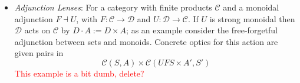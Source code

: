 \documentclass[11pt,letterpaper]{article}
\theoremstyle{plain}
\theoremstyle{definition}
\newtheorem{remark}[theorem]{Remark}
\newcommand{\C}{\mathscr{C}}
\newcommand{\homC}{\underline{\C}}
\newcommand{\D}{\mathscr{D}}
\newcommand{\Optic}{\mathbf{Optic}}
\newcommand{\hto}{\ensuremath{\,\mathaccent\shortmid\rightarrow\,}}
\newcommand{\todo}[1]{\textcolor{red}{\small #1}}
\begin{document}
\begin{itemize}

\item \emph{Adjunction Lenses}: For a category with finite products $\C$ and a monoidal adjunction $F \dashv U$, with $F : \C \to \D$ and $U : \D \to \C$. If $U$ is strong monoidal then $\D$ acts on $\C$ by $D \cdot A := D \times A$; as an example consider the free-forgetful adjunction between sets and monoids. Concrete optics for this action are given pairs in
\[ \C(S, A) \times \C(UFS \times A', S') \]
\todo{This example is a bit dumb, delete?}
\end{itemize}
\end{document}
